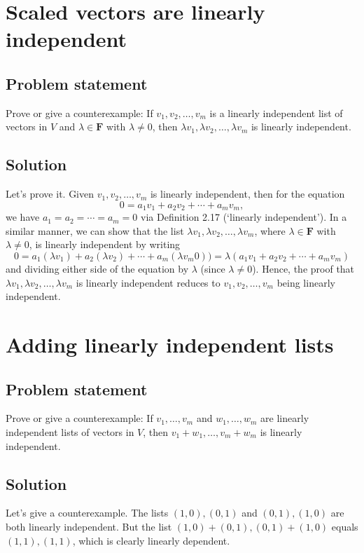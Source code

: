 \documentclass{article}
\begin{document}
\clearpage

\renewcommand{\thesection}{8}
\section{Scaled vectors are linearly independent}
\subsection*{Problem statement}
Prove or give a counterexample: 
If $v_1,v_2,\ldots,v_m$ is a linearly independent list of vectors in $V$ and $\lambda\in\mathbf{F}$ with $\lambda\neq 0$, then $\lambda v_1,\lambda v_2,\ldots,\lambda v_m$ is linearly independent.

\subsection*{Solution}
Let's prove it. 
Given $v_1,v_2,\ldots,v_m$ is linearly independent, then for the equation
\[0=a_1v_1+a_2v_2+\cdots+a_m v_m,\]
we have $a_1=a_2=\cdots=a_m=0$ via Definition 2.17 (`linearly independent'). 
In a similar manner, we can show that the list $\lambda v_1,\lambda v_2,\ldots,\lambda v_m$, where $\lambda\in\mathbf{F}$ with $\lambda\neq 0$, is linearly independent by writing
\[0=a_1(\lambda v_1)+a_2(\lambda v_2)+\cdots+a_m(\lambda v_m0))=\lambda(a_1v_1+a_2v_2+\cdots+a_m v_m)\]
and dividing either side of the equation by $\lambda$ (since $\lambda\neq 0$). 
Hence, the proof that $\lambda v_1,\lambda v_2,\ldots,\lambda v_m$ is linearly independent reduces to $v_1,v_2,\ldots,v_m$ being linearly independent.

\clearpage

\renewcommand{\thesection}{9}
\section{Adding linearly independent lists}
\subsection*{Problem statement}
Prove or give a counterexample: 
If $v_1,\ldots,v_m$ and $w_1,\ldots,w_m$ are linearly independent lists of vectors in $V$, then $v_1+w_1,\ldots,v_m+w_m$ is linearly independent.

\subsection*{Solution}
Let's give a counterexample. 
The lists $(1,0),(0,1)$ and $(0,1),(1,0)$ are both linearly independent. 
But the list $(1,0)+(0,1),(0,1)+(1,0)$ equals $(1,1),(1,1)$, which is clearly linearly dependent.
\end{document}

